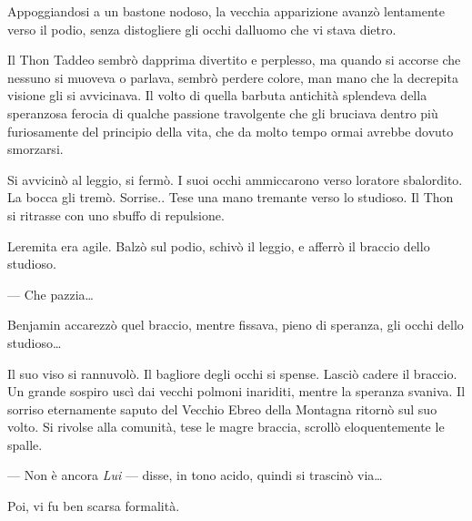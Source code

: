 Appoggiandosi a un bastone nodoso, la vecchia apparizione avanzò
lentamente verso il podio, senza distogliere gli occhi
dall\textquotesingle uomo che vi stava dietro.

Il Thon Taddeo sembrò dapprima divertito e perplesso, ma quando si
accorse che nessuno si muoveva o parlava, sembrò perdere colore, man
mano che la decrepita visione gli si avvicinava. Il volto di quella
barbuta antichità splendeva della speranzosa ferocia di qualche passione
travolgente che gli bruciava dentro più furiosamente del principio della
vita, che da molto tempo ormai avrebbe dovuto smorzarsi.

Si avvicinò al leggio, si fermò. I suoi occhi ammiccarono verso
l\textquotesingle oratore sbalordito. La bocca gli tremò. Sorrise.. Tese
una mano tremante verso lo studioso. Il Thon si ritrasse con uno sbuffo
di repulsione.

L\textquotesingle eremita era agile. Balzò sul podio, schivò il leggio,
e afferrò il braccio dello studioso.

--- Che pazzia\ldots{}

Benjamin accarezzò quel braccio, mentre fissava, pieno di speranza, gli
occhi dello studioso\ldots{}

Il suo viso si rannuvolò. Il bagliore degli occhi si spense. Lasciò
cadere il braccio. Un grande sospiro uscì dai vecchi polmoni inariditi,
mentre la speranza svaniva. Il sorriso eternamente saputo del Vecchio
Ebreo della Montagna ritornò sul suo volto. Si rivolse alla comunità,
tese le magre braccia, scrollò eloquentemente le spalle.

--- Non è ancora \emph{Lui} --- disse, in tono acido, quindi si trascinò
via\ldots{}

Poi, vi fu ben scarsa formalità.
